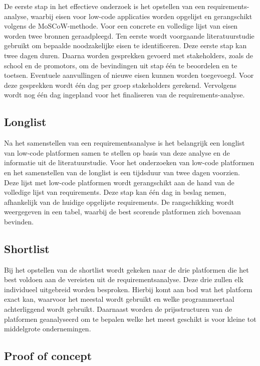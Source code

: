 De eerste stap in het effectieve onderzoek is het opstellen van een requirements-analyse, waarbij eisen voor low-code applicaties worden opgelijst en gerangschikt volgens de MoSCoW-metho\-de. Voor een concrete en volledige lijst van eisen worden twee bronnen geraadpleegd. Ten eerste wordt voorgaande literatuurstudie gebruikt om bepaalde noodzakelijke eisen te identificeren. Deze eerste stap kan twee dagen duren. Daarna worden gesprekken gevoerd met stakeholders, zoals de school en de promotors, om de bevindingen uit stap één te beoordelen en te toetsen. Eventuele aanvullingen of nieuwe eisen kunnen worden toegevoegd. Voor deze gesprekken wordt één dag per groep stakeholders gerekend. Vervolgens wordt nog één dag ingepland voor het finaliseren van de requirements-analyse.

\subsection{Longlist}
\label{sec:Longlist}

Na het samenstellen van een requirementsanalyse is het belangrijk een longlist van low-code platformen samen te stellen op basis van deze analyse en de informatie uit de literatuurstudie. Voor het onderzoeken van low-code platformen en het samenstellen van de longlist is een tijdsduur van twee dagen voorzien.
Deze lijst met low-code platformen wordt gerangschikt aan de hand van de volledige lijst van requirements. Deze stap kan één dag in beslag nemen, afhankelijk van de huidige opgelijste requirements. De rangschikking wordt weergegeven in een tabel, waarbij de best scorende platformen zich bovenaan bevinden.

\subsection{Shortlist}
\label{sec:Shortlist}

Bij het opstellen van de shortlist wordt gekeken naar de drie platformen die het best voldoen aan de vereisten uit de requirementsanalyse. Deze drie zullen elk individueel uitgebreid worden besproken. Hierbij komt aan bod wat het platform exact kan, waarvoor het meestal wordt gebruikt en welke programmeertaal achterliggend wordt gebruikt. Daarnaast worden de prijsstructuren van de platformen geanalyseerd om te bepalen welke het meest geschikt is voor kleine tot middelgrote ondernemingen.

\subsection{Proof of concept}
\label{sec:Proof of concept}


